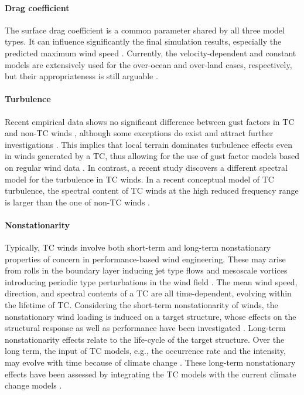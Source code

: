 \paragraph{Drag coefficient} The surface drag coefficient is a common parameter shared by all three model types. It can influence significantly the final simulation results, especially the predicted maximum wind speed \citep{li2015observations, powell2003reduced}. Currently, the velocity-dependent and constant models are extensively used for the over-ocean and over-land cases, respectively, but their appropriateness is still arguable \citep{smith2014sensitivity}. 

\paragraph{Turbulence} Recent empirical data shows no significant difference between gust factors in TC and non-TC winds \citep{vickery2009hurricane-a}, although some exceptions do exist and attract further investigations \citep{yu2008hurricane, yu2009gust}. This implies that local terrain dominates turbulence effects even in winds generated by a TC, thus allowing for the use of gust factor models based on regular wind data \citep[e.g.,][]{esdu2008strong}. In contrast, a recent study discovers a different spectral model for the turbulence in TC winds. In a recent conceptual model of TC turbulence, the spectral content of TC winds at the high reduced frequency range is larger than the one of non-TC winds \citep{hu2017tropical, li2015turbulence}.

\paragraph{Nonstationarity} Typically, TC winds involve both short-term and long-term nonstationary properties of concern in performance-based wind engineering. These may arise from rolls in the boundary layer inducing jet type flows and mesoscale vortices introducing periodic type perturbations in the wind field \citep{li2015turbulence, li2019observed, fernandez2019observing, wurman2017damage}. The mean wind speed, direction, and spectral contents of a TC are all time-dependent, evolving within the lifetime of TC. Considering the short-term nonstationarity of winds, the nonstationary wind loading is induced on a target structure, whose effects on the structural response as well as performance have been investigated \citep{kareem2019generalized, kwon2009gustfront, yau2011hurricane}. Long-term nonstationarity effects relate to the life-cycle of the target structure. Over the long term, the input of TC models, e.g., the occurrence rate and the intensity, may evolve with time because of climate change \citep{emanuel2005increasing}. These long-term nonstationary effects have been assessed by integrating the TC models with the current climate change models \citep{emanuel2008hurricanes,lauren2014assessing,lin2015integrated,liu2014projections}.

